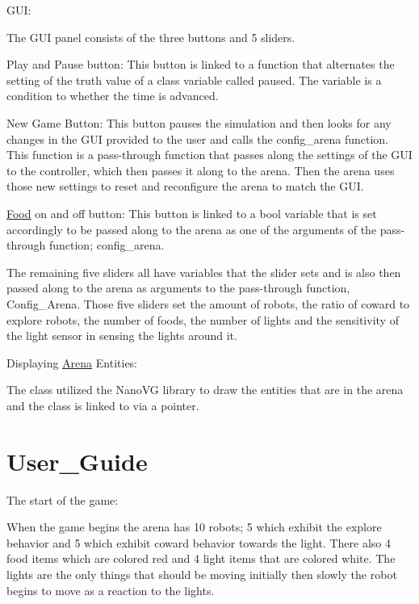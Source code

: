 \begin{DoxyItemize}
\item G\+UI\+:
\begin{DoxyItemize}
\item The G\+UI panel consists of the three buttons and 5 sliders.
\item Play and Pause button\+: This button is linked to a function that alternates the setting of the truth value of a class variable called paused. The variable is a condition to whether the time is advanced.
\item New Game Button\+: This button pauses the simulation and then looks for any changes in the G\+UI provided to the user and calls the config\+\_\+arena function. This function is a pass-\/through function that passes along the settings of the G\+UI to the controller, which then passes it along to the arena. Then the arena uses those new settings to reset and reconfigure the arena to match the G\+UI.
\item \mbox{\hyperlink{class_food}{Food}} on and off button\+: This button is linked to a bool variable that is set accordingly to be passed along to the arena as one of the arguments of the pass-\/through function; config\+\_\+arena.
\item The remaining five sliders all have variables that the slider sets and is also then passed along to the arena as arguments to the pass-\/through function, Config\+\_\+\+Arena. Those five sliders set the amount of robots, the ratio of coward to explore robots, the number of foods, the number of lights and the sensitivity of the light sensor in sensing the lights around it.
\end{DoxyItemize}
\item Displaying \mbox{\hyperlink{class_arena}{Arena}} Entities\+:
\begin{DoxyItemize}
\item The class utilized the Nano\+VG library to draw the entities that are in the arena and the class is linked to via a pointer.
\end{DoxyItemize}
\end{DoxyItemize}\hypertarget{index_User_Guide}{}\section{User\+\_\+\+Guide}\label{index_User_Guide}
The start of the game\+:

When the game begins the arena has 10 robots; 5 which exhibit the explore behavior and 5 which exhibit coward behavior towards the light. There also 4 food items which are colored red and 4 light items that are colored white. The lights are the only things that should be moving initially then slowly the robot begins to move as a reaction to the lights.

